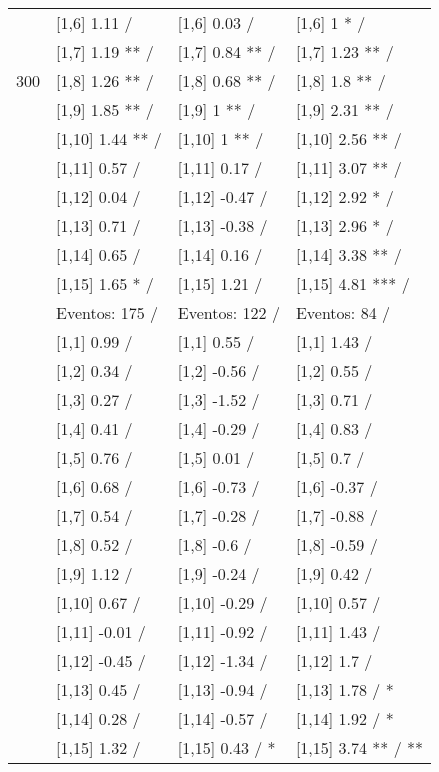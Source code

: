 \begin{table}
\begin{tabular}[t]{llll}
 & {}[1,6] 1.11  / & {}[1,6] 0.03  / & {}[1,6] 1 * /\\
 & {}[1,7] 1.19 ** / & {}[1,7] 0.84 ** / & {}[1,7] 1.23 ** /\\
300 & {}[1,8] 1.26 ** / & {}[1,8] 0.68 ** / & {}[1,8] 1.8 ** /\\
\addlinespace
 & {}[1,9] 1.85 ** / & {}[1,9] 1 ** / & {}[1,9] 2.31 ** /\\
 & {}[1,10] 1.44 ** / & {}[1,10] 1 ** / & {}[1,10] 2.56 ** /\\
 & {}[1,11] 0.57  / & {}[1,11] 0.17  / & {}[1,11] 3.07 ** /\\
 & {}[1,12] 0.04  / & {}[1,12] -0.47  / & {}[1,12] 2.92 * /\\
 & {}[1,13] 0.71  / & {}[1,13] -0.38  / & {}[1,13] 2.96 * /\\
\addlinespace
 & {}[1,14] 0.65  / & {}[1,14] 0.16  / & {}[1,14] 3.38 ** /\\
 & {}[1,15] 1.65 * / & {}[1,15] 1.21  / & {}[1,15] 4.81 *** /\\
 & Eventos:  175 / & Eventos:  122 / & Eventos:  84 /\\
 & {}[1,1] 0.99  / & {}[1,1] 0.55  / & {}[1,1] 1.43  /\\
 & {}[1,2] 0.34  / & {}[1,2] -0.56  / & {}[1,2] 0.55  /\\
\addlinespace
 & {}[1,3] 0.27  / & {}[1,3] -1.52  / & {}[1,3] 0.71  /\\
 & {}[1,4] 0.41  / & {}[1,4] -0.29  / & {}[1,4] 0.83  /\\
 & {}[1,5] 0.76  / & {}[1,5] 0.01  / & {}[1,5] 0.7  /\\
 & {}[1,6] 0.68  / & {}[1,6] -0.73  / & {}[1,6] -0.37  /\\
 & {}[1,7] 0.54  / & {}[1,7] -0.28  / & {}[1,7] -0.88  /\\
\addlinespace
500 & {}[1,8] 0.52  / & {}[1,8] -0.6  / & {}[1,8] -0.59  /\\
 & {}[1,9] 1.12  / & {}[1,9] -0.24  / & {}[1,9] 0.42  /\\
 & {}[1,10] 0.67  / & {}[1,10] -0.29  / & {}[1,10] 0.57  /\\
 & {}[1,11] -0.01  / & {}[1,11] -0.92  / & {}[1,11] 1.43  /\\
 & {}[1,12] -0.45  / & {}[1,12] -1.34  / & {}[1,12] 1.7  /\\
\addlinespace
 & {}[1,13] 0.45  / & {}[1,13] -0.94  / & {}[1,13] 1.78  / *\\
 & {}[1,14] 0.28  / & {}[1,14] -0.57  / & {}[1,14] 1.92  / *\\
 & {}[1,15] 1.32  / & {}[1,15] 0.43  / * & {}[1,15] 3.74 ** / **\\
\bottomrule
\end{tabular}
\end{table}
